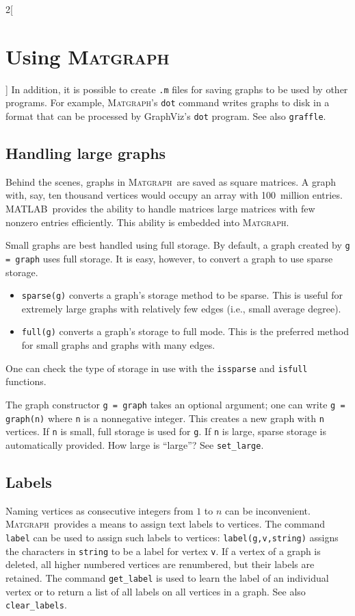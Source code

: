 \documentclass{amsart}
\newcommand\matlab{MATLAB}
\newcommand\matgraph{\textsc{Matgraph}}
\begin{document}
\begin{multicols}{2}[\section{Using \matgraph}]
In addition, it is possible to create \verb|.m| files for saving
graphs to be used by other programs. For example, \matgraph's
\verb|dot| command writes graphs to disk in a format that can be
processed by GraphViz's \verb|dot| program. See also \verb|graffle|. 


\subsection{Handling large graphs}
\label{subsect:large}

Behind the scenes, graphs in \matgraph\ are saved as square matrices.
A graph with, say, ten thousand vertices would occupy an array with
100~million entries. \matlab\ provides the ability to handle matrices
large matrices with few nonzero entries efficiently. This ability is
embedded into \matgraph.

Small graphs are best handled using full storage. By default, a
graph created by \verb|g = graph| uses full storage. It is easy,
however, to convert a graph to use sparse storage.

\begin{itemize}
\item \verb|sparse(g)| converts a graph's storage method to be
  sparse. This is useful for extremely large graphs with relatively
  few edges (i.e., small average degree).

\item \verb|full(g)| converts a graph's storage to full mode. This is
  the preferred method for small graphs and graphs with many edges.
\end{itemize}

One can check the type of storage in use with the \verb|issparse| and
\verb|isfull| functions.

\smallbreak

The graph constructor \verb|g = graph| takes an optional argument; one
can write \verb|g = graph(n)| where \verb|n| is a nonnegative
integer. This creates a new graph with \verb|n| vertices. If \verb|n|
is small, full storage is used for \verb|g|. If \verb|n| is large,
sparse storage is automatically provided. How large is ``large''? See
\verb|set_large|. 


\subsection{Labels}

Naming vertices as consecutive integers from $1$ to $n$ can be
inconvenient. \matgraph\ provides a means to assign text labels to
vertices. The command \verb|label| can be used to assign such labels
to vertices: \verb|label(g,v,string)| assigns the characters in
\verb|string| to be a label for vertex \verb|v|. If a vertex of a
graph is deleted, all higher numbered vertices are renumbered, but
their labels are retained. The command \verb|get_label| is used to
learn the label of an individual vertex or to return a list of all
labels on all vertices  in a graph. See also \verb|clear_labels|.




\end{multicols}
\end{document}
